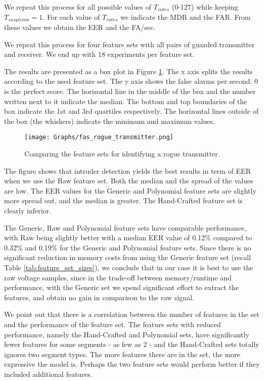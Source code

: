 \documentclass[english]{llncs}
\begin{document}
  We repeat this process for all possible values of $T_{votes}$ (0-127) while keeping $T_{suspicion} = 1$. For each value of $T_{votes}$ we indicate the MDR and the FAR. From these values we obtain the EER and the FA/sec.
  
  We repeat this process for four feature sets with all pairs of guarded transmitter and receiver. We end up with 18 experiments per feature set.
  
  The results are presented as a box plot in Figure \ref{fig:rogue_transmitter_results}. The x axis splits the results according to the used feature set. The y axis shows the false alarms per second:
  0 is the perfect score. The horizontal line in the middle of the box and the number written next to it indicate the median. The bottom and top boundaries of the box indicate the 1st and 3rd quartiles respectively. The horizontal lines outside of the box (the whiskers) indicate the minimum and maximum values.
  
  \begin{figure}[t]
    \centering
    \texttt{[image: Graphs/fas\_rogue\_transmitter.png]}
    \caption{Comparing the feature sets for identifying a rogue transmitter.} 
    \label{fig:rogue_transmitter_results}
  \end{figure}
  
  The figure shows that intruder detection yields the best results in term of EER when we use the Raw feature set. Both the median and the spread of the values are low. The EER values for the Generic and Polynomial feature sets are slightly more spread out, and the median is greater. The Hand-Crafted feature set is clearly inferior.
  
  The Generic, Raw and Polynomial feature sets have comparable performance, with Raw being slightly better with a median EER value of 0.12\% compared to 0.32\% and 0.19\% for the Generic and Polynomial feature sets. Since there is no significant reduction in memory costs from using the Generic feature set (recall Table \ref{tab:feature_set_sizes}), we conclude that in our case it is best to use the raw voltage samples, since in the trade-off between memory/runtime and performance, with the Generic set we spend significant effort to extract the features, and obtain no gain in comparison to the raw signal.
  
  We point out that there is a correlation between the number of features in the set and the performance of the feature set. The feature sets with reduced performance, namely the Hand-Crafted and Polynomial sets, have significantly fewer features for some segments - as few as 2 - and the Hand-Crafted sets totally ignores two segment types. The more features there are in the set, the more expressive the model is. Perhaps the two feature sets would perform better if they included additional features.
  
\end{document}
